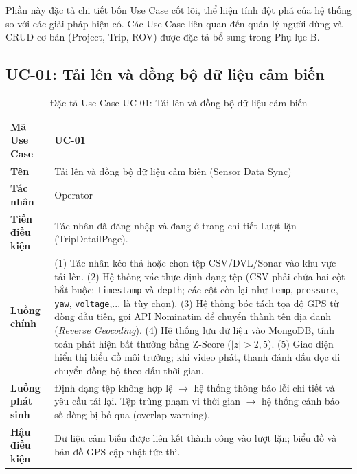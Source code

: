 \documentclass[../DoAn.tex]{subfiles}
\begin{document}
Phần này đặc tả chi tiết bốn Use Case cốt lõi, thể hiện tính đột phá của hệ thống so với các giải pháp hiện có. Các Use Case liên quan đến quản lý người dùng và CRUD cơ bản (Project, Trip, ROV) được đặc tả bổ sung trong Phụ lục B.

\subsection{UC-01: Tải lên và đồng bộ dữ liệu cảm biến}
\label{subsection:2.3.1}

\begin{longtable}{|p{3.5cm}|p{10.0cm}|}
\caption{Đặc tả Use Case UC-01: Tải lên và đồng bộ dữ liệu cảm biến}\label{tab:uc01}\\
\hline
\textbf{Mã Use Case} & UC-01 \\
\hline
\textbf{Tên} & Tải lên và đồng bộ dữ liệu cảm biến (Sensor Data Sync) \\
\hline
\textbf{Tác nhân} & Operator \\
\hline
\textbf{Tiền điều kiện} & Tác nhân đã đăng nhập và đang ở trang chi tiết Lượt lặn (TripDetailPage). \\
\hline
\textbf{Luồng chính} &
(1) Tác nhân kéo thả hoặc chọn tệp CSV/DVL/Sonar vào khu vực tải lên. \newline
(2) Hệ thống xác thực định dạng tệp (CSV phải chứa hai cột bắt buộc: \texttt{timestamp} và \texttt{depth}; các cột còn lại như \texttt{temp}, \texttt{pressure}, \texttt{yaw}, \texttt{voltage},... là tùy chọn). \newline
(3) Hệ thống bóc tách tọa độ GPS từ dòng đầu tiên, gọi API Nominatim để chuyển thành tên địa danh (\textit{Reverse Geocoding}). \newline
(4) Hệ thống lưu dữ liệu vào MongoDB, tính toán phát hiện bất thường bằng Z-Score ($|z| > 2{,}5$). \newline
(5) Giao diện hiển thị biểu đồ môi trường; khi video phát, thanh đánh dấu dọc di chuyển đồng bộ theo dấu thời gian. \\
\hline
\textbf{Luồng phát sinh} & Định dạng tệp không hợp lệ $\to$ hệ thống thông báo lỗi chi tiết và yêu cầu tải lại. Tệp trùng phạm vi thời gian $\to$ hệ thống cảnh báo số dòng bị bỏ qua (overlap warning). \\
\hline
\textbf{Hậu điều kiện} & Dữ liệu cảm biến được liên kết thành công vào lượt lặn; biểu đồ và bản đồ GPS cập nhật tức thì. \\
\hline
\end{longtable}
\end{document}
